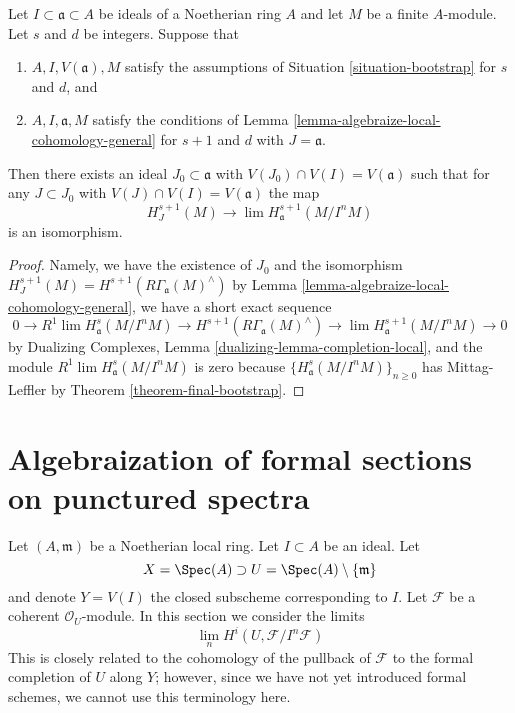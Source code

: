 \begin{lemma}
\label{lemma-combine-two}
Let $I \subset \mathfrak a \subset A$ be ideals of a Noetherian ring $A$
and let $M$ be a finite $A$-module. Let $s$ and $d$ be integers.
Suppose that
\begin{enumerate}
\item $A, I, V(\mathfrak a), M$ satisfy the assumptions of
Situation \ref{situation-bootstrap} for $s$ and $d$, and
\item $A, I, \mathfrak a, M$ satisfy the conditions of
Lemma \ref{lemma-algebraize-local-cohomology-general}
for $s + 1$ and $d$ with $J = \mathfrak a$.
\end{enumerate}
Then there exists an ideal
$J_0 \subset \mathfrak a$ with $V(J_0) \cap V(I) = V(\mathfrak a)$
such that for any $J \subset J_0$ with $V(J) \cap V(I) = V(\mathfrak a)$
the map
$$
H^{s + 1}_J(M) \longrightarrow \lim H^{s + 1}_\mathfrak a(M/I^nM)
$$
is an isomorphism.
\end{lemma}

\begin{proof}
Namely, we have the existence of $J_0$
and the isomorphism
$H^{s + 1}_J(M) = H^{s + 1}(R\Gamma_\mathfrak a(M)^\wedge)$
by Lemma \ref{lemma-algebraize-local-cohomology-general},
we have a short exact sequence
$$
0 \to R^1\lim H^s_\mathfrak a(M/I^nM) \to
H^{s + 1}(R\Gamma_\mathfrak a(M)^\wedge) \to
\lim H^{s + 1}_\mathfrak a(M/I^nM) \to 0
$$
by Dualizing Complexes, Lemma \ref{dualizing-lemma-completion-local},
and the module $R^1\lim H^s_\mathfrak a(M/I^nM)$ is zero because
$\{H^s_\mathfrak a(M/I^nM)\}_{n \geq 0}$ has Mittag-Leffler
by Theorem \ref{theorem-final-bootstrap}.
\end{proof}








\section{Algebraization of formal sections on punctured spectra}
\label{section-algebraization-sections}

\noindent
Let $(A, \mathfrak m)$ be a Noetherian local ring.
Let $I \subset A$ be an ideal. Let
$$
X = \Spec(A) \supset U = \Spec(A) \setminus \{\mathfrak m\}
$$
and denote $Y = V(I)$ the closed subscheme corresponding to $I$.
Let $\mathcal{F}$ be a coherent $\mathcal{O}_U$-module.
In this section we consider the limits
$$
\lim_n H^i(U, \mathcal{F}/I^n\mathcal{F})
$$
This is closely related to the cohomology of the pullback
of $\mathcal{F}$ to the formal completion of $U$ along $Y$;
however, since we have not yet introduced formal schemes,
we cannot use this terminology here.

